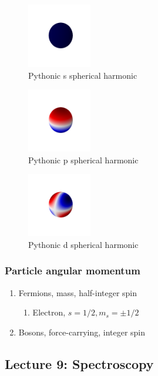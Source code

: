 \documentclass[11pt]{article}
\begin{document}
\begin{figure}[htbp]
\centering
\includegraphics[width=0.25\textwidth]{./Images/s.png}
\caption{Pythonic s spherical harmonic}
\end{figure} 

\begin{figure}[htbp]
\centering
\includegraphics[width=0.25\textwidth]{./Images/p.png}
\caption{Pythonic p spherical harmonic}
\end{figure}

\begin{figure}[htbp]
\centering
\includegraphics[width=0.25\textwidth]{./Images/d.png}
\caption{Pythonic d spherical harmonic}
\end{figure}

\subsubsection{Particle angular momentum}
\label{sec:orgd370fdb}
\begin{enumerate}
\item Fermions, mass, half-integer spin
\begin{enumerate}
\item Electron, \(s=1/2, m_s=\pm 1/2\)
\end{enumerate}
\item Bosons, force-carrying, integer spin
\end{enumerate}
\subsection{Lecture 9: Spectroscopy}
\label{sec:orga5b420d}
\end{document}
